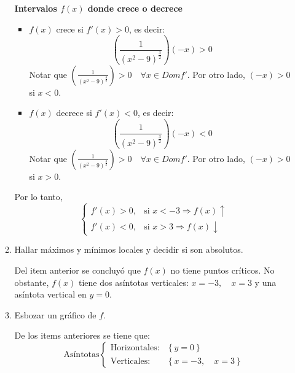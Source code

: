 \documentclass{article}
\begin{document}
\begin{enumerate}
\begin{enumerate}
                    \textbf{Intervalos $f(x)$ donde crece o decrece}
                    \begin{itemize}
                        \item $f(x)$ crece si $f'(x) > 0$, es decir:
                              $$\left(\frac{1}{(x^2-9)^{\frac{3}{2}}} \right) (-x) > 0$$
                              Notar que $\left(\frac{1}{(x^2-9)^{\frac{3}{2}}} \right) > 0 \quad \forall x \in Domf'$. Por otro lado, $(-x) > 0$ si $x < 0$.
                        \item $f(x)$ decrece si $f'(x) < 0$, es decir:
                              $$\left(\frac{1}{(x^2-9)^{\frac{3}{2}}} \right) (-x) < 0$$
                              Notar que $\left(\frac{1}{(x^2-9)^{\frac{3}{2}}} \right) > 0 \quad \forall x \in Domf'$. Por otro lado, $(-x) > 0$ si $x > 0$.
                    \end{itemize}
                    Por lo tanto,
                    \begin{equation*}
                        \begin{cases}
                            f'(x)> 0, & \text{si $x < -3 \Rightarrow f(x) \uparrow$}  \\
                            f'(x)< 0, & \text{si $x > 3 \Rightarrow f(x) \downarrow$}
                        \end{cases}
                    \end{equation*}

              \item Hallar máximos y mínimos locales y decidir si son absolutos.

                    Del item anterior se concluyó que $f(x)$ no tiene puntos críticos. No obstante, $f(x)$ tiene dos asíntotas verticales: $x=-3, \quad x=3$ y una asíntota vertical en $y=0$.

              \item Esbozar un gráfico de $f$.

                    De los items anteriores se tiene que:
                    \begin{equation*}
                        \text{Asíntotas}\begin{cases}
                            \text{Horizontales}: & \left\{ \text{$y=0$} \right\}             \\
                            \text{Verticales}:   & \left\{ \text{$x=-3, \quad x=3$} \right\}
                        \end{cases}
                    \end{equation*}


\end{enumerate}
\end{enumerate}
\end{document}
